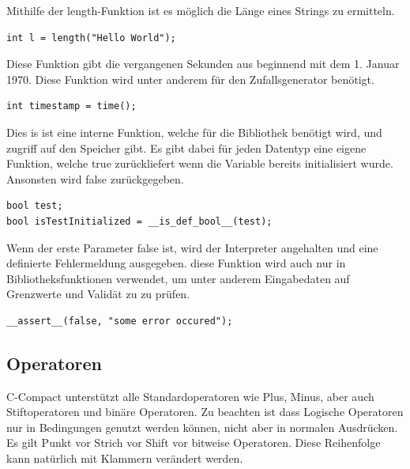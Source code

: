 \newpage
{}

Mithilfe der length-Funktion ist es m\"oglich die L\"ange eines Strings zu ermitteln.

\begin{lstlisting}[language=CMM]
int l = length("Hello World");
\end{lstlisting}


Diese Funktion gibt die vergangenen Sekunden aus beginnend mit dem 1. Januar 1970. Diese Funktion wird unter anderem f\"ur den Zufallsgenerator ben\"otigt.

\begin{lstlisting}[language=CMM]
int timestamp = time();
\end{lstlisting}


Dies is ist eine interne Funktion, welche f\"ur die Bibliothek ben\"otigt wird, und zugriff auf den Speicher gibt. Es gibt dabei f\"ur jeden Datentyp eine eigene Funktion, welche true zur\"uckliefert wenn die Variable bereits initialisiert wurde. Ansonsten wird false zur\"uckgegeben.

\begin{lstlisting}[language=CMM]
bool test;
bool isTestInitialized = __is_def_bool__(test);
\end{lstlisting}


Wenn der erste Parameter false ist, wird der Interpreter angehalten und eine definierte Fehlermeldung ausgegeben. diese Funktion wird auch nur in Bibliotheksfunktionen verwendet, um unter anderem Eingabedaten auf Grenzwerte und Valid\"at zu zu pr\"ufen.

\begin{lstlisting}[language=CMM]
__assert__(false, "some error occured");
\end{lstlisting}

\newpage
\subsection{Operatoren}

C-Compact unterst\"utzt alle Standardoperatoren wie Plus, Minus, aber auch Stiftoperatoren und binäre Operatoren. Zu beachten ist dass Logische Operatoren nur in Bedingungen genutzt werden k\"onnen, nicht aber in normalen Ausdr\"ucken. Es gilt Punkt vor Strich vor Shift vor bitweise Operatoren. Diese Reihenfolge kann nat\"urlich mit Klammern ver\"andert werden.

